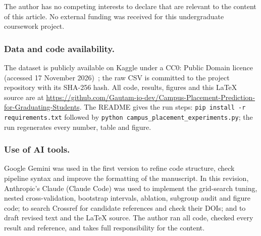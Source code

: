 \documentclass[runningheads]{llncs}
\begin{document}
\begin{credits}
\subsubsection{\discintname}
The author has no competing interests to declare that are relevant to the content of this article. No external funding was received for this undergraduate coursework project.

\subsubsection{Data and code availability.}
The dataset is publicly available on Kaggle under a CC0: Public Domain licence (accessed 17 November 2026)~\cite{dataset}; the raw CSV is committed to the project repository with its SHA-256 hash. All code, results, figures and this \LaTeX{} source are at \url{https://github.com/Gautam-io-dev/Campus-Placement-Prediction-for-Graduating-Students}. The README gives the run steps: \texttt{pip install -r requirements.txt} followed by \texttt{python campus\_placement\_experiments.py}; the run regenerates every number, table and figure.

\subsubsection{Use of AI tools.}
Google Gemini was used in the first version to refine code structure, check pipeline syntax and improve the formatting of the manuscript. In this revision, Anthropic's Claude (Claude Code) was used to implement the grid-search tuning, nested cross-validation, bootstrap intervals, ablation, subgroup audit and figure code; to search Crossref for candidate references and check their DOIs; and to draft revised text and the \LaTeX{} source. The author ran all code, checked every result and reference, and takes full responsibility for the content.
\end{credits}
\end{document}
